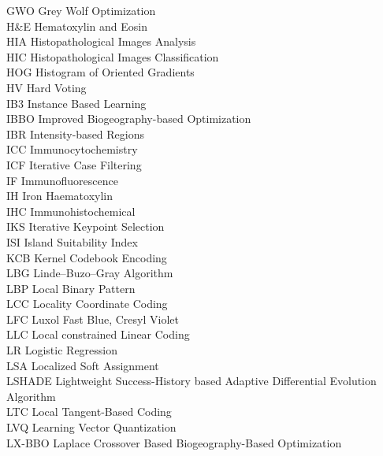 \begin{nomenclature}
\begin{tabbing}
GWO	\> \quad \quad\quad	Grey Wolf Optimization	\\
H\&E	\> \quad \quad\quad	Hematoxylin and Eosin	\\
HIA	\> \quad \quad\quad	Histopathological Images Analysis	\\
HIC	\> \quad \quad\quad	Histopathological Images Classification	\\
HOG	\> \quad \quad\quad	 Histogram of Oriented Gradients	\\
HV	\> \quad \quad\quad	Hard Voting	\\
IB3	\> \quad \quad\quad	Instance Based Learning	\\
IBBO	\> \quad \quad\quad	Improved Biogeography-based Optimization	\\
IBR	\> \quad \quad\quad	Intensity-based Regions	\\
ICC	\> \quad \quad\quad	Immunocytochemistry	\\
ICF	\> \quad \quad\quad	Iterative Case Filtering	\\
IF	\> \quad \quad\quad	Immunofluorescence	\\
IH	\> \quad \quad\quad	Iron Haematoxylin	\\
IHC	\> \quad \quad\quad	Immunohistochemical	\\
IKS	\> \quad \quad\quad	Iterative Keypoint Selection	\\
ISI	\> \quad \quad\quad	Island Suitability Index	\\
KCB	\> \quad \quad\quad	Kernel Codebook Encoding	\\
LBG	\> \quad \quad\quad	Linde–Buzo–Gray Algorithm	\\
LBP	\> \quad \quad\quad	Local Binary Pattern	\\
LCC	\> \quad \quad\quad	Locality Coordinate  Coding	\\
LFC	\> \quad \quad\quad	Luxol Fast Blue, Cresyl Violet	\\
LLC	\> \quad \quad\quad	Local constrained Linear Coding	\\
LR	\> \quad \quad\quad	Logistic Regression	\\
LSA	\> \quad \quad\quad	Localized Soft Assignment	\\
LSHADE	\> \quad \quad\quad	Lightweight Success-History based Adaptive Differential Evolution Algorithm	\\
LTC	\> \quad \quad\quad	Local Tangent-Based Coding	\\
LVQ	\> \quad \quad\quad	Learning Vector Quantization 	\\
LX-BBO	\> \quad \quad\quad	Laplace Crossover Based Biogeography-Based Optimization	\\

\end{tabbing}
\end{nomenclature}
